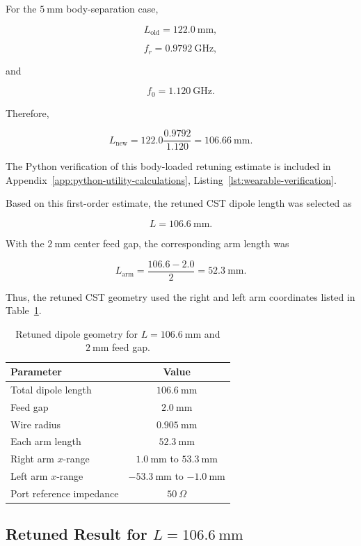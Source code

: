 For the \(5~\mathrm{mm}\) body-separation case,

\[
L_{\mathrm{old}} = 122.0~\mathrm{mm},
\]

\[
f_r = 0.9792~\mathrm{GHz},
\]

and

\[
f_0 = 1.120~\mathrm{GHz}.
\]

Therefore,

\[
L_{\mathrm{new}}
=
122.0
\frac{0.9792}{1.120}
=
106.66~\mathrm{mm}.
\]

The Python verification of this body-loaded retuning estimate is included in Appendix~\ref{app:python-utility-calculations}, Listing~\ref{lst:wearable-verification}.

Based on this first-order estimate, the retuned CST dipole length was selected as

\[
L = 106.6~\mathrm{mm}.
\]

With the \(2~\mathrm{mm}\) center feed gap, the corresponding arm length was

\[
L_{\mathrm{arm}}
=
\frac{106.6-2.0}{2}
=
52.3~\mathrm{mm}.
\]

Thus, the retuned CST geometry used the right and left arm coordinates listed in Table~\ref{tab:retuned-l106p6-geometry}.

\begin{table}[htbp]
\centering
\caption{Retuned dipole geometry for \(L=106.6~\mathrm{mm}\) and \(2~\mathrm{mm}\) feed gap.}
\label{tab:retuned-l106p6-geometry}
\begin{tabular}{lc}
\hline
\textbf{Parameter} & \textbf{Value} \\
\hline
Total dipole length & \(106.6~\mathrm{mm}\) \\
Feed gap & \(2.0~\mathrm{mm}\) \\
Wire radius & \(0.905~\mathrm{mm}\) \\
Each arm length & \(52.3~\mathrm{mm}\) \\
Right arm \(x\)-range & \(1.0~\mathrm{mm}\) to \(53.3~\mathrm{mm}\) \\
Left arm \(x\)-range & \(-53.3~\mathrm{mm}\) to \(-1.0~\mathrm{mm}\) \\
Port reference impedance & \(50~\Omega\) \\
\hline
\end{tabular}
\end{table}

\subsection{Retuned Result for \(L=106.6~\mathrm{mm}\)}

